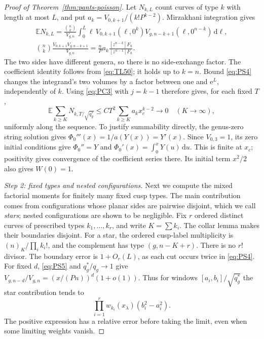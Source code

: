 \begin{proof}[Proof of Theorem~\ref{thm:pants-poisson}]
Let $N_{k,L}$ count curves of type $k$ with length at most $L$, and put
$a_k=V_{0,k+1}/(k!P^{k-2})$. Mirzakhani integration gives
\begin{equation}
 \begin{aligned}
 \mathbb E N_{k,L}=\frac{\binom nk}{V_{g,n}}
 \int_0^L\ell\,V_{0,k+1}(\ell,0^k)
                  V_{g,n-k+1}(\ell,0^{n-k})\,\mathrm{d}\ell,\\
 \binom nk\frac{V_{0,k+1}V_{g,n-k+1}}{V_{g,n}}
 =\frac nP a_k\frac{[z^{n-k}]F_h}{[z^{n-1}]F_h}.
 \end{aligned}
 \label{eq:PC4}
\end{equation}
The two sides have different genera, so there is no side-exchange
factor. The coefficient identity follows from \eqref{eq:TL50}; it
holds up to $k=n$. Bound \eqref{eq:PS4} changes the integrand's two
volumes by a factor between one and $\mathrm{e}^L$, independently of $k$.
Using \eqref{eq:PC3} with $j=k-1$ therefore gives, for each fixed $T$,
\begin{equation}
 \mathbb E\sum_{k\ge K}N_{k,T/\sqrt{q_g^*}}
 \le CT^2\sum_{k\ge K}a_kx_c^{k-2}\longrightarrow0
 \quad(K\to\infty),
 \label{eq:PC5}
\end{equation}
uniformly along the sequence. To justify summability directly, the
genus-zero string solution gives $\Phi_0'''(x)=1/a(Y(x))=Y'(x)$.
Since $V_{0,3}=1$, its zero initial conditions give
$\Phi_0''=Y$ and $\Phi_0'(x)=\int_0^xY(u)\,\mathrm{d}u$. This is finite at
$x_c$; positivity gives convergence of the coefficient series there.
Its initial term $x^2/2$ also gives $W(0)=1$.

\emph{Step 2: fixed types and nested configurations.}
Next we compute the mixed factorial moments for finitely many fixed cusp
types. The main contribution comes from configurations whose planar
sides are pairwise disjoint, which we call \emph{stars}; nested
configurations are shown to be negligible.
Fix $r$ ordered distinct curves of prescribed types $k_1,\ldots,k_r$,
and write $K=\sum k_i$. The collar lemma makes their boundaries
disjoint. For a star, the ordered
cusp-label multiplicity is $(n)_K/\prod_i k_i!$, and the complement
has type $(g,n-K+r)$. There is no $r!$ divisor. The boundary error is
$1+O_r(L)$, as each cut occurs twice in \eqref{eq:PS4}.
For fixed $d$, \eqref{eq:PS5} and $q_g^*/q_g\to1$ give
$V_{g,n-d}/V_{g,n}=(x/(Pn))^d(1+o(1))$.
Thus for windows $[a_i,b_i]/\sqrt{q_g^*}$ the star contribution tends to
\begin{equation}
 \prod_{i=1}^r
       w_{k_i}(x_\lambda)(b_i^2-a_i^2).
 \label{eq:PC6}
\end{equation}
The positive expression has a relative error before taking the limit,
even when some limiting weights vanish.


\end{proof}
